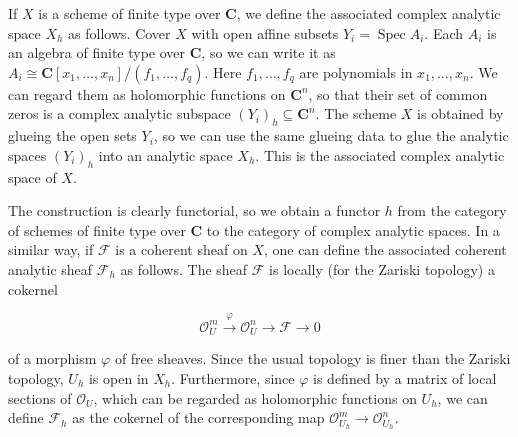 If $X$ is a scheme of finite type over $\mathbf{C}$, we define the associated complex analytic space $X_h$ as follows. Cover $X$ with open affine subsets $Y_i = \operatorname{Spec} A_i$. Each $A_i$ is an algebra of finite type over $\mathbf{C}$, so we can write it as $A_i \cong \mathbf{C}[x_1, \ldots, x_n]/(f_1, \ldots, f_q)$. Here $f_1, \ldots, f_q$ are polynomials in $x_1, \ldots, x_n$. We can regard them as holomorphic functions on $\mathbf{C}^n$, so that their set of common zeros is a complex analytic subspace $(Y_i)_h \subseteq \mathbf{C}^n$. The scheme $X$ is obtained by glueing the open sets $Y_i$, so we can use the same glueing data to glue the analytic spaces $(Y_i)_h$ into an analytic space $X_h$. This is the associated complex analytic space of $X$.

The construction is clearly functorial, so we obtain a functor $h$ from the category of schemes of finite type over $\mathbf{C}$ to the category of complex analytic spaces. In a similar way, if $\mathcal{F}$ is a coherent sheaf on $X$, one can define the associated coherent analytic sheaf $\mathcal{F}_h$ as follows. The sheaf $\mathcal{F}$ is locally (for the Zariski topology) a cokernel

$$\mathcal{O}_U^m \xrightarrow{\varphi} \mathcal{O}_U^n \rightarrow \mathcal{F} \rightarrow 0$$

of a morphism $\varphi$ of free sheaves. Since the usual topology is finer than the Zariski topology, $U_h$ is open in $X_h$. Furthermore, since $\varphi$ is defined by a matrix of local sections of $\mathcal{O}_U$, which can be regarded as holomorphic functions on $U_h$, we can define $\mathcal{F}_h$ as the cokernel of the corresponding map $\mathcal{O}_{U_h}^m \to \mathcal{O}_{U_h}^n$.
